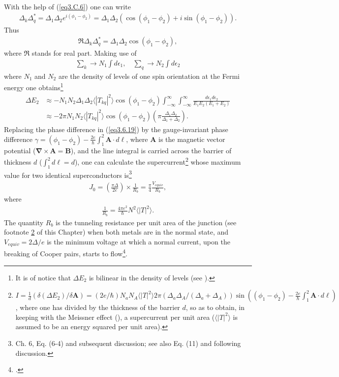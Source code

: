 With the help of (\ref{eq3.C.6}) one can write
\begin{align}
\Delta_k\Delta_q^*=\Delta_1\Delta_2e^{i(\phi_1-\phi_2)}=\Delta_1\Delta_2\left(\cos(\phi_1-\phi_2)+i\sin(\phi_1-\phi_2)\right).
\end{align}
Thus
\begin{align}
\Re\Delta_k\Delta_q^*=\Delta_1\Delta_2\cos(\phi_1-\phi_2),
\end{align}
where $\Re$ stands for real part. Making use of
\begin{align}
\sum_k\rightarrow N_1\int d\epsilon_1,\quad\sum_q\rightarrow N_2\int d\epsilon_2
\end{align}
where $N_1$ and $N_2$ are the density of levels of one spin orientation at the Fermi energy one  obtains\footnote{It is of notice that $\Delta E_2$ is bilinear in the density of levels (see \cite{Potel:17}).}
\begin{align}\label{eq3.6.19}
\nonumber\Delta E_2&\approx-N_1N_2\Delta_1 \Delta_2 \langle|T_{kq}|^2\rangle \cos(\phi_1-\phi_2)\int_{-\infty}^{\infty}\int_{-\infty}^{\infty}\frac{d\epsilon_1 d\epsilon_2}{E_1 E_2(E_1+E_2)}\\
&\approx -2\pi N_1 N_2 \langle|T_{kq}|^2\rangle \cos(\phi_1-\phi_2) \left(\pi\frac{\Delta_1\Delta_2}{\Delta_1+\Delta_2}\right).
\end{align}
Replacing the phase difference in (\ref{eq3.6.19}) by the gauge-invariant phase difference $\gamma=(\phi_1-\phi_2)-\frac{2e}{\hbar}\int_1^2\mathbf A\cdot d\pmb \ell$, where $\mathbf A$ is the magnetic vector potential ($\pmb\nabla\times\mathbf A=\mathbf B$), and the line integral is carried across the barrier of thickness $d$ ($\int_1^2d\ell=d$), one can calculate the supercurrent\footnote{\label{f57C4} $I=\frac{1}{d}\left(\delta(\Delta E_2)/\delta\mathbf A\right)=\left(2e/\hbar\right)N_aN_A\langle|T|^2\rangle2\pi(\Delta_a\Delta_A/(\Delta_a+\Delta_A))\sin\left((\phi_1-\phi_2)-\frac{2e}{\hbar}\int_1^2\mathbf A\cdot d\pmb \ell\right)$, where one has divided by the thickness of the barrier $d$, so as to obtain, in keeping with the Meissner effect (\cite{Meissner:33}), a supercurrent per unit area ($\langle|T|^2\rangle$ is assumed to be an energy squared per unit area).} whose maximum value for two identical superconductors is\footnote{\cite{Tinkham:96} Ch. 6, Eq. (6-4) and subsequent discussion; see also \cite{Anderson:64} Eq. (11) and following discussion.}
\begin{align}\label{eq4.7.20}
J_0=\left(\frac{\pi\Delta}{2e}\right)\times\frac{1}{R_b}=\frac{\pi}{4}\frac{V_{equiv}}{R_b},
\end{align}
where
\begin{align}\label{eq4.7.21}
\frac{1}{R_b}=\frac{4\pi e^2}{\hbar}N^2\langle|T|^2\rangle.
\end{align}
The quantity  $R_b$ is the tunneling resistance per unit area of the junction (see footnote \ref{f57C4} of this Chapter) when both metals are in the normal state, and $V_{equiv}=2\Delta/e$ is the minimum voltage at which a normal current, upon the breaking of Cooper pairs, starts to flow\footnote{\cite{Giaver:73}.}. 
  

